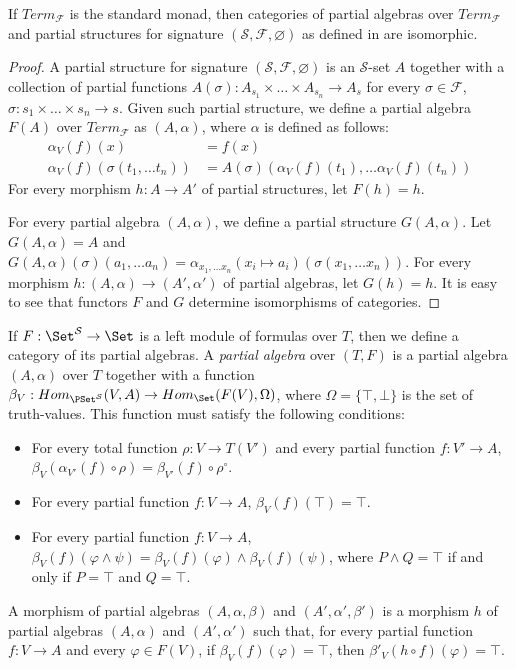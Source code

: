 \begin{lem}
If $Term_\mathcal{F}$ is the standard monad, then categories of partial algebras over $Term_\mathcal{F}$
    and partial structures for signature $(\mathcal{S},\mathcal{F},\varnothing)$ as defined in \cite{PHL} are isomorphic.
\end{lem}
\begin{proof}
A partial structure for signature $(\mathcal{S},\mathcal{F},\varnothing)$ is an $\mathcal{S}$-set $A$ together with a collection of partial functions
    $A(\sigma) : A_{s_1} \times \ldots \times A_{s_n} \to A_s$ for every $\sigma \in \mathcal{F}$, $\sigma : s_1 \times \ldots \times s_n \to s$.
Given such partial structure, we define a partial algebra $F(A)$ over $Term_\mathcal{F}$ as $(A,\alpha)$, where $\alpha$ is defined as follows:
\begin{align*}
\alpha_V(f)(x) & = f(x) \\
\alpha_V(f)(\sigma(t_1, \ldots t_n)) & = A(\sigma)(\alpha_V(f)(t_1), \ldots \alpha_V(f)(t_n))
\end{align*}
For every morphism $h : A \to A'$ of partial structures, let $F(h) = h$.

For every partial algebra $(A,\alpha)$, we define a partial structure $G(A,\alpha)$.
Let $G(A,\alpha) = A$ and $G(A,\alpha)(\sigma)(a_1, \ldots a_n) = \alpha_{x_1, \ldots x_n}(x_i \mapsto a_i)(\sigma(x_1, \ldots x_n))$.
For every morphism $h : (A,\alpha) \to (A',\alpha')$ of partial algebras, let $G(h) = h$.
It is easy to see that functors $F$ and $G$ determine isomorphisms of categories.
\end{proof}

If $F : \Set^\mathcal{S} \to \Set$ is a left module of formulas over $T$, then we define a category of its partial algebras.
A \emph{partial algebra} over $(T,F)$ is a partial algebra $(A,\alpha)$ over $T$ together with a function $\beta_V : Hom_{\PSet^\mathcal{S}}(V,A) \to Hom_\Set(F(V),\Omega)$,
    where $\Omega = \{ \top, \bot \}$ is the set of truth-values.
This function must satisfy the following conditions:
\begin{itemize}
\item For every total function $\rho : V \to T(V')$ and every partial function $f : V' \to A$, $\beta_V(\alpha_{V'}(f) \circ \rho) = \beta_{V'}(f) \circ \rho^\circ$.
\item For every partial function $f : V \to A$, $\beta_V(f)(\top) = \top$.
\item For every partial function $f : V \to A$, $\beta_V(f)(\varphi \land \psi) = \beta_V(f)(\varphi) \land \beta_V(f)(\psi)$,
    where $P \land Q = \top$ if and only if $P = \top$ and $Q = \top$.
\end{itemize}
A morphism of partial algebras $(A,\alpha,\beta)$ and $(A',\alpha',\beta')$ is a morphism $h$ of partial algebras $(A,\alpha)$ and $(A',\alpha')$
    such that, for every partial function $f : V \to A$ and every $\varphi \in F(V)$, if $\beta_V(f)(\varphi) = \top$, then $\beta'_V(h \circ f)(\varphi) = \top$.

